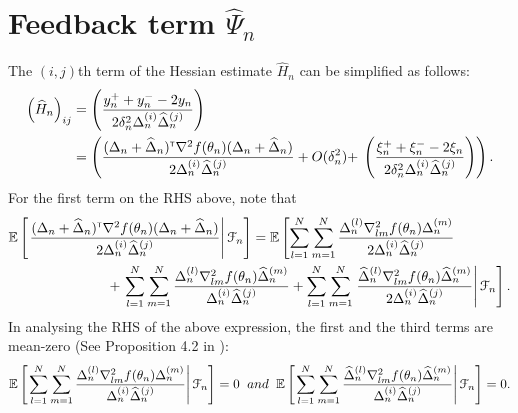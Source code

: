 \section{Feedback term $\widehat \Psi_n$}
The $(i,j)$th term of the Hessian estimate $\widehat H_n$ can be simplified as follows: 
\begin{align}
\left(\widehat H_n \right)_{ij} & =  \left(\dfrac{y_n^+ + y_n^- - 2 y_n}{2\delta_n^2 \Delta_n^{(i)} \widehat \Delta_n^{(j)}}\right) \nonumber \\
& = \left( \frac{(\Delta_n+ \widehat \Delta_n)^\mathsf{\scriptscriptstyle T} \nabla^2 f(\theta_n) (\Delta_n+ \widehat \Delta_n)}{2\Delta_n^{(i)} \widehat \Delta_n^{(j)}} +  O(\delta_n^2) + \right.\left.\left(\dfrac{\xi_n^+ + \xi_n^- - 2 \xi_n}{2\delta_n^2 \Delta_n^{(i)} \widehat \Delta_n^{(j)}} \right)\right).\label{eq:h3}
\end{align}
For the first term on the RHS above, note that
\begin{align}
&\mathbb{E}\left[\left.  \frac{(\Delta_n+ \widehat \Delta_n)^\mathsf{\scriptscriptstyle T} \nabla^2 f(\theta_n) (\Delta_n+ \widehat \Delta_n)}{2\Delta_n^{(i)} \widehat \Delta_n^{(j)}}  \right | \mathcal{F}_n\right] =\mathbb{E}\left[\sum\limits_{l=1}^N\sum\limits_{m=1}^N \frac{\Delta_n^{(l)} \nabla^2_{lm} f(\theta_n) \Delta_n^{(m)}}{2\Delta_n^{(i)} \widehat\Delta_n^{(j)}} \right.\nonumber \\&\hspace{2.5cm}+\left. \sum\limits_{l=1}^N\sum\limits_{m=1}^N \frac{\Delta_n^{(l)} \nabla^2_{lm} f(\theta_n) \widehat\Delta_n^{(m)}}{\Delta_n^{(i)} \widehat\Delta_n^{(j)}} +\sum\limits_{l=1}^N\sum\limits_{m=1}^N \left. \frac{\widehat\Delta_n^{(l)} \nabla^2_{lm} f(\theta_n)\widehat \Delta_n^{(m)}}{2\Delta_n^{(i)} \widehat\Delta_n^{(j)}}\right| \mathcal{F}_n\right].\label{eq:2spsaexp}
\end{align}
In analysing the RHS of the above expression, the first and the third terms are mean-zero (See Proposition 4.2 in \cite{bhatnagar2015simultaneous}):
\begin{align}
\mathbb{E}\left[\left.\sum\limits_{l=1}^N\sum\limits_{m=1}^N \frac{\Delta_n^{(l)} \nabla^2_{lm} f(\theta_n) \Delta_n^{(m)}}{\Delta_n^{(i)} \widehat\Delta_n^{(j)}} \right | \mathcal{F}_n\right] = 0 \hspace{0.2cm} and \hspace{0.2cm}\mathbb{E}\left[\left.\sum\limits_{l=1}^N\sum\limits_{m=1}^N \frac{\widehat\Delta_n^{(l)} \nabla^2_{lm} f(\theta_n) \widehat\Delta_n^{(m)}}{\Delta_n^{(i)} \widehat\Delta_n^{(j)} }\right | \mathcal{F}_n\right] = 0.
\end{align}
